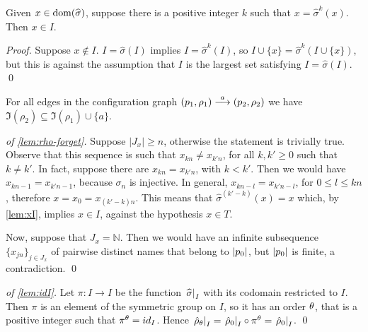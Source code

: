 
\begin{lemma}
\label{lem:xI}
Given $x \in \operatorname{dom}(\widehat{\sigma})$, suppose there is a positive integer $k$ such that $x = \widehat{\sigma}^k (x)$. Then $x \in I$.
\end{lemma}
\begin{proof}
Suppose $x \notin I$. $I = \widehat{\sigma}(I)$ implies $I = \widehat{\sigma}^k(I)$, so $I \cup \{x\} = \widehat{\sigma}^k(I \cup \{x\})$, but this is against the assumption that $I$ is the largest set satisfying $I = \widehat{\sigma}(I)$.
\qed
\end{proof}

\begin{lemma}
\label{lem:tr-names}
For all edges in the configuration graph $(p_1,\rho_1) \overset{a}{\longrightarrow} (p_2,\rho_2)$ we have $\Im(\rho_2) \subseteq \Im(\rho_1) \cup \{ a \}$.
\end{lemma}


\begin{proof}[of \cref{lem:rho-forget}]
Suppose $|J_x| \geq n$, otherwise the statement is trivially true. Observe that this sequence is such that $x_{kn} \neq x_{k'n}$, for all $k,k' \geq 0$ such that $k \neq k'$. In fact, suppose there are $x_{kn} = x_{k'n}$, with $k < k'$. Then we would have $x_{kn-1} = x_{k'n-1}$, because $\sigma_{n}$ is injective. In general, $x_{kn-l} = x_{k'n-l}$, for $0 \leq l \leq kn$, therefore $x = x_0 = x_{(k'-k)n}$. This means that $\widehat{\sigma}^{(k'-k)}(x) = x$ which, by \cref{lem:xI}, implies $x \in I$, against the hypothesis $x \in T$.

Now, suppose that $J_x = \mathbb{N}$. Then we would have an infinite subsequence $\{x_{jn}\}_{j \in J_x}$ of pairwise distinct names that belong to $|p_0|$, but $|p_0|$ is finite, a contradiction.
\qed
\end{proof}


\begin{proof}[of \cref{lem:idI}]\hfill

\item Let $\pi \colon I \to I$ be the function $\left.\widehat{\sigma}\right|_{I}$ with its codomain restricted to $I$. Then $\pi$ is an element of the symmetric group on $I$, so it has an order $\theta$, that is a positive integer such that $\pi^\theta = id_I$. Hence $\left. \hat{\rho}_\theta \right|_{ I } =\left. \hat{\rho}_0 \right|_{I} \circ \pi^\theta = \left. \hat{\rho}_0 \right|_{I}$.
\qed
\end{proof}

